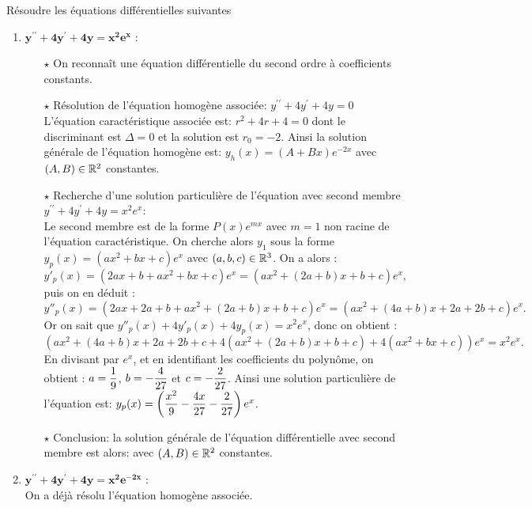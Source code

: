 \documentclass[a4paper, 11pt,reqno]{article}
\begin{document}
\begin{correction}  \;
R\'esoudre les \'equations diff\'erentielles suivantes
\begin{enumerate}
\item  $\mathbf{y^{\prime\prime}+4y^{\prime}+4y=x^2e^x}$ :\\
\begin{itemize}
\item[$\star$] On reconna\^{i}t une \'equation diff\'erentielle du second ordre \`{a} coefficients constants.
\item[$\star$] R\'esolution de l'\'equation homog\`{e}ne associ\'ee: $y^{\prime\prime}+4y^{\prime}+4y=0$\\
\noindent L'\'equation caract\'eristique associ\'ee est: $r^2+4r+4=0$ dont le discriminant est $\Delta=0$ et la solution est $r_0=-2$. Ainsi la solution g\'en\'erale de l'\'equation homog\`{e}ne est: $y_h(x)= (A +B x)e^{-2x}$ avec $(A,B)\in\mathbb{R}^2$ constantes.
\item[$\star$] Recherche d'une solution particuli\`{e}re de l'\'equation avec second membre $y^{\prime\prime}+4y^{\prime}+4y=x^2e^x$:\\
\noindent Le second membre est de la forme $P(x) e^{mx}$ avec $m=1$ non racine de l'\'equation caract\'eristique. On cherche alors $y_1$ sous la forme $y_p(x)=(ax^2+bx+c)e^{x}$ avec $(a,b,c)\in\mathbb{R}^3$. On a alors :
$$y'_p(x) = (2ax+b+ax^2+bx+c)e^x = (ax^2+(2a+b)x+b+c)e^x,$$ 
puis on en d\'eduit : 
$$y''_p(x)=(2ax+2a+b+ax^2+(2a+b)x+b+c)e^x = (ax^2+(4a+b)x+2a+2b+c)e^x.$$
Or on sait que $y''_p(x) + 4y'_p(x) + 4y_p(x) = x^2e^x$, donc on obtient :
$$(ax^2+(4a+b)x+2a+2b+c + 4(ax^2+(2a+b)x+b+c) +4(ax^2+bx+c))e^x = x^2e^x.$$
En divisant par $e^x$, et en identifiant les coefficients du polyn\^{o}me, on obtient : $a=\displaystyle\frac{1}{9}$, $b=-\displaystyle\frac{4}{27}$ et $c=-\displaystyle\frac{2}{27}$. Ainsi une solution particuli\`{e}re de l'\'equation est: $y_p(x)= \left( \displaystyle\frac{x^2}{9}-\displaystyle\frac{4x}{27}-\displaystyle\frac{2}{27}\right) e^x$.
\item[$\star$] Conclusion: la solution g\'en\'erale de l'\'equation diff\'erentielle avec second membre est alors:  avec $(A,B)\in\mathbb{R}^2$ constantes.
\end{itemize}
\item $\mathbf{y^{\prime\prime}+4y^{\prime}+4y=x^2e^{-2x}}$ :\\
On a d\'ej\`a r\'esolu l'\'equation homog\`ene associ\'ee.\\

\end{enumerate}
\end{correction}
\end{document}
